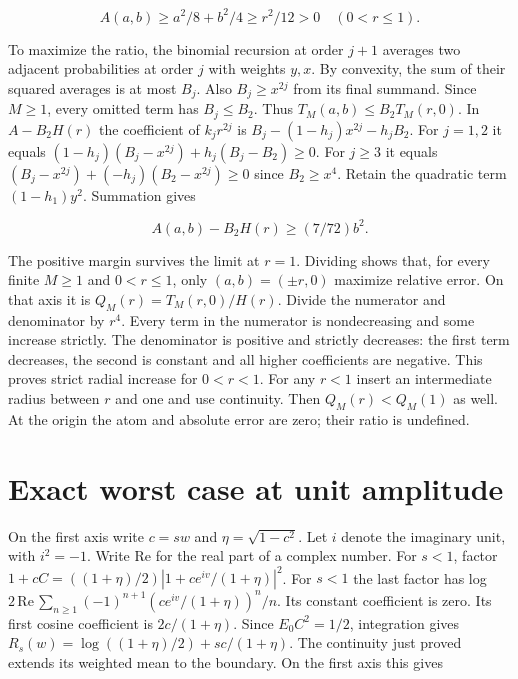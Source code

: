 \[
A(a,b)\ge a^2/8+b^2/4\ge r^2/12>0\quad(0<r\le1).
\]

To maximize the ratio, the binomial recursion at order \(j+1\) averages two adjacent probabilities at order \(j\) with weights \(y,x\). By convexity, the sum of their squared averages is at most \(B_j\). Also \(B_j\ge x^{2j}\) from its final summand. Since \(M\ge1\), every omitted term has \(B_j\le B_2\). Thus \(T_M(a,b)\le B_2T_M(r,0)\). In \(A-B_2H(r)\) the coefficient of \(k_jr^{2j}\) is \(B_j-(1-h_j)x^{2j}-h_jB_2\). For \(j=1,2\) it equals \((1-h_j)(B_j-x^{2j})+h_j(B_j-B_2)\ge0\). For \(j\ge3\) it equals \((B_j-x^{2j})+(-h_j)(B_2-x^{2j})\ge0\) since \(B_2\ge x^4\). Retain the quadratic term \((1-h_1)y^2\). Summation gives

\[
A(a,b)-B_2H(r)\ge (7/72)b^2.
\]

The positive margin survives the limit at \(r=1\). Dividing shows that, for every finite \(M\ge1\) and \(0<r\le1\), only \((a,b)=(\pm r,0)\) maximize relative error. On that axis it is \(Q_M(r)=T_M(r,0)/H(r)\). Divide the numerator and denominator by \(r^4\). Every term in the numerator is nondecreasing and some increase strictly. The denominator is positive and strictly decreases: the first term decreases, the second is constant and all higher coefficients are negative. This proves strict radial increase for \(0<r<1\). For any \(r<1\) insert an intermediate radius between \(r\) and one and use continuity. Then \(Q_M(r)<Q_M(1)\) as well. At the origin the atom and absolute error are zero; their ratio is undefined.

\clearpage

\section{Exact worst case at unit amplitude}\label{exact-worst-case-at-unit-amplitude}

On the first axis write \(c=sw\) and \(\eta=\sqrt{1-c^2}\). Let \(i\) denote the imaginary unit, with \(i^2=-1\). Write \(\mathrm{Re}\) for the real part of a complex number. For \(s<1\), factor \(1+cC=((1+\eta)/2)|1+c e^{iv}/(1+\eta)|^2\). For \(s<1\) the last factor has log \(2\,\mathrm{Re}\,\sum_{n\ge1}(-1)^{n+1}(c e^{iv}/(1+\eta))^n/n\). Its constant coefficient is zero. Its first cosine coefficient is \(2c/(1+\eta)\). Since \(E_0 C^2=1/2\), integration gives \(R_s(w)=\log((1+\eta)/2)+sc/(1+\eta)\). The continuity just proved extends its weighted mean to the boundary. On the first axis this gives

